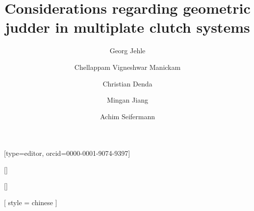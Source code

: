\documentclass[a4paper,fleqn]{cas-dc}
\begin{document}
\let\WriteBookmarks\relax
\def\floatpagepagefraction{1}
\def\textpagefraction{.001}

\title [mode = title]{Considerations regarding geometric judder in multiplate clutch systems}                      





\author[1]{Georg Jehle}[type=editor,
                        orcid=0000-0001-9074-9397]
\cormark[1]
\fnmark[1]


\address[1]{Schaeffler Automotive Buehl GmbH \& Co. KG, Industriestr. 2, Bühl, Germany}

\author[2]{Chellappam Vigneshwar Manickam}[]
\author[1]{Christian Denda}[]

\author[3]{Mingan Jiang}[%
   style = chinese
   ]


\address[2]{Rheinwestfälische Technische Hochschule Aachen, Aachen, Germany}

\author[1]{Achim Seifermann}

\address[3]{Schaeffler China., Anting,
    China}

\end{document}
